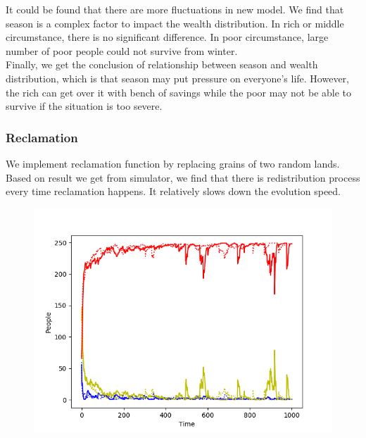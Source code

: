 It could be found that there are more fluctuations in new model. We find that season is a complex factor to impact the wealth distribution. In rich or middle circumstance, there is no significant difference. In poor circumstance, large number of poor people could not survive from winter.\\

Finally, we get the conclusion of relationship between season and wealth distribution, which is that season may put pressure on everyone's life. However, the rich can get over it with bench of savings while the poor may not be able to survive if the situation is too severe.

\subsubsection{Reclamation}
We implement reclamation function by replacing grains of two random lands. Based on result we get from simulator, we find that there is redistribution process every time reclamation happens. It relatively slows down the evolution speed.
\begin{figure}[H]
	\begin{center}
		\includegraphics[scale= 0.6]{reclamation.png}
	\end{center}
\end{figure}

